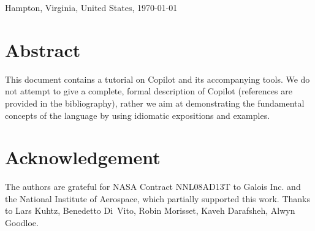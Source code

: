 \documentclass[12pt]{article}
\theoremstyle{example}
\begin{document}
\begin{center}
\vspace{1cm}

{\large
Hampton, Virginia, United States, \today
}


\let\thefootnote\relax{}

\end{center}

\vspace{0.25cm}

\section*{Abstract}

{
\small
This document contains a tutorial on Copilot and its accompanying tools.
We do not attempt to give a complete, formal description of Copilot
(references are provided in the bibliography), rather we aim at
demonstrating the fundamental concepts of the language by using idiomatic
expositions and examples.
}

{
\small
\setcounter{tocdepth}{2}
\tableofcontents
}

\newpage
{}
\section*{Acknowledgement}

The authors are grateful for NASA Contract NNL08AD13T to Galois Inc. and the
National Institute of Aerospace, which partially supported this work.
Thanks to Lars Kuhtz, Benedetto Di~Vito,  Robin Morisset, Kaveh
Darafsheh, Alwyn Goodloe.  

{





 
 
 
 


}

\begin{appendices}


\end{appendices}
\end{document}
